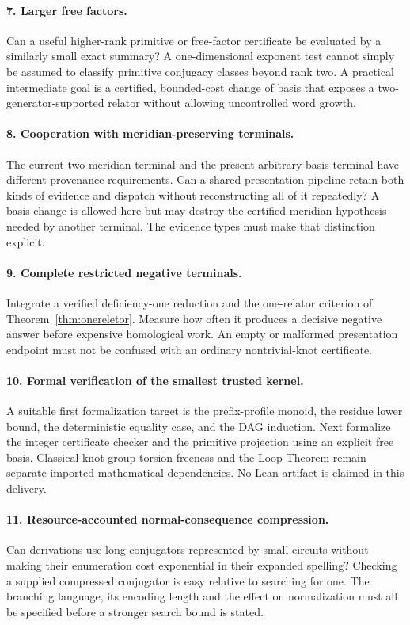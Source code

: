 \documentclass[11pt,letterpaper]{article}
\theoremstyle{definition}
\begin{document}
\paragraph{7. Larger free factors.}
Can a useful higher-rank primitive or free-factor certificate be evaluated
by a similarly small exact summary? A one-dimensional exponent test cannot
simply be assumed to classify primitive conjugacy classes beyond rank two.
A practical intermediate goal is a certified, bounded-cost change of basis
that exposes a two-generator-supported relator without allowing uncontrolled
word growth.

\paragraph{8. Cooperation with meridian-preserving terminals.}
The current two-meridian terminal and the present arbitrary-basis terminal
have different provenance requirements. Can a shared presentation pipeline
retain both kinds of evidence and dispatch without reconstructing all of it
repeatedly? A basis change is allowed here but may destroy the certified
meridian hypothesis needed by another terminal. The evidence types must
make that distinction explicit.

\paragraph{9. Complete restricted negative terminals.}
Integrate a verified deficiency-one reduction and the one-relator criterion
of Theorem~\ref{thm:onereletor}. Measure how often it produces a decisive
negative answer before expensive homological work. An empty or malformed
presentation endpoint must not be confused with an ordinary nontrivial-knot
certificate.

\paragraph{10. Formal verification of the smallest trusted kernel.}
A suitable first formalization target is the prefix-profile monoid, the
residue lower bound, the deterministic equality case, and the DAG induction.
Next formalize the integer certificate checker and the primitive projection
using an explicit free basis. Classical knot-group torsion-freeness and the
Loop Theorem remain separate imported mathematical dependencies. No Lean
artifact is claimed in this delivery.

\paragraph{11. Resource-accounted normal-consequence compression.}
Can derivations use long conjugators represented by small circuits without
making their enumeration cost exponential in their expanded spelling?
Checking a supplied compressed conjugator is easy relative to searching
for one. The branching language, its encoding length and the effect on
normalization must all be specified before a stronger search bound is stated.
\end{document}
